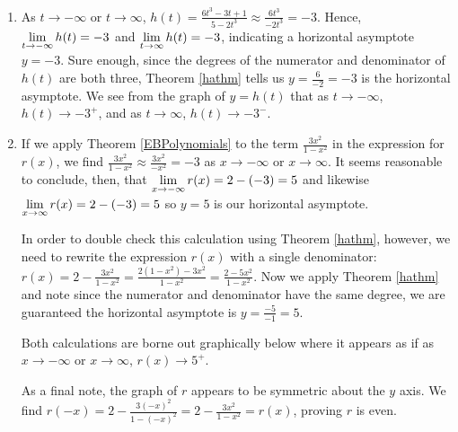 \documentclass{ximera}
\begin{document}
\begin{ex}
\begin{enumerate}
\begin{center}
\begin{tabular}{cc}
\end{tabular}
\end{center} 

\item   As $t \rightarrow -\infty$ or $t \rightarrow \infty$,  $h(t) = \frac{6t^3-3t+1}{5-2t^3} \approx  \frac{6t^3}{-2t^3} = -3$.  Hence, $\ds{\lim_{t \rightarrow  -\infty} h(t) = -3}$ and $\ds{\lim_{t \rightarrow  \infty} h(t) = -3}$, indicating a horizontal asymptote $y = -3$.  Sure enough, since the degrees of the numerator and denominator of $h(t)$ are both three,  Theorem \ref{hathm} tells us $y = \frac{6}{-2} = -3$ is the horizontal asymptote.  We see from the graph of $y = h(t)$ that as $t \rightarrow -\infty$, $h(t) \rightarrow -3^{+}$, and as $t \rightarrow \infty$, $h(t) \rightarrow -3^{-}$.

\item  If we apply Theorem \ref{EBPolynomials} to the term  $\frac{3x^2}{1-x^2}$ in the expression for $r(x)$, we find   $\frac{3x^2}{1-x^2} \approx \frac{3x^2}{-x^2} = -3$ as $x \rightarrow -\infty$ or $x \rightarrow \infty$.  It  seems reasonable to conclude, then, that  $\ds{\lim_{x \rightarrow  -\infty} r(x) = 2 - (-3) = 5}$ and likewise $\ds{\lim_{x \rightarrow  \infty} r(x) = 2 - (-3) = 5}$ so $y = 5$ is our horizontal asymptote. 

 In order to double check this calculation using  Theorem \ref{hathm}, however, we need to rewrite the expression $r(x)$ with a single denominator:  $r(x) = 2 - \frac{3x^2}{1-x^2} = \frac{2(1-x^2) - 3x^2}{1-x^2} = \frac{2-5x^2}{1-x^2}$.  Now we apply Theorem \ref{hathm}  and note since the numerator and denominator have the same degree, we are guaranteed the horizontal asymptote is $y = \frac{-5}{-1} = 5$.  
 
Both  calculations are borne out graphically below where it appears as if as $x \rightarrow  -\infty$ or $x \rightarrow \infty$, $r(x) \rightarrow 5^{+}$. 

 As a final note, the graph of $r$ appears to be symmetric about the $y$ axis.  We find $r(-x) = 2 - \frac{3(-x)^2}{1-(-x)^2} = 2 - \frac{3x^2}{1-x^2} = r(x)$, proving $r$ is even.

\begin{center}
\begin{tabular}{cc}


\end{tabular}
\end{center}
\end{enumerate}
\end{ex}
\end{document}
